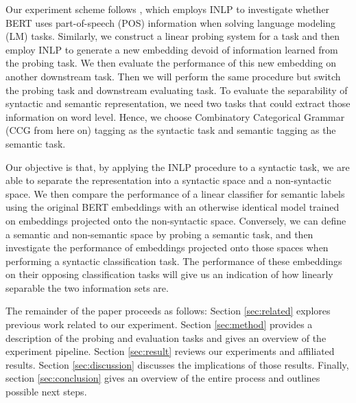 \documentclass[11pt,a4paper]{article}
\begin{document}
Our experiment scheme follows \citealp{amnesia}, which employs INLP to investigate whether BERT uses part-of-speech (POS) information when solving language modeling (LM) tasks. Similarly, we construct a linear probing system for a task and then employ INLP to generate a new embedding devoid of information learned from the probing task. We then evaluate the performance of this new embedding on another downstream task. Then we will perform the same procedure but switch the probing task and downstream evaluating task. To evaluate the separability of syntactic and semantic representation, we need two tasks that could extract those information on word level. Hence, we choose Combinatory Categorical Grammar (CCG from here on) tagging \citep{ccg-bank} as the syntactic task and semantic tagging \citep{semantics_tagging} as the semantic task. 

Our objective is that, by applying the INLP procedure to a syntactic task, we are able to separate the representation into a syntactic space and a non-syntactic space. We then compare the performance of a linear classifier for semantic labels using the original BERT embeddings with an otherwise identical model trained on embeddings projected onto the non-syntactic space. Conversely, we can define a semantic and non-semantic space by probing a semantic task, and then investigate the performance of embeddings projected onto those spaces when performing a syntactic classification task. The performance of these embeddings on their opposing classification tasks will give us an indication of how linearly separable the two information sets are.%



The remainder of the paper proceeds as follows: Section \ref{sec:related} explores previous work related to our experiment. Section \ref{sec:method} provides a description of the probing and evaluation tasks and gives an overview of the experiment pipeline. Section \ref{sec:result} reviews our experiments and affiliated results. Section \ref{sec:discussion} discusses the implications of those results. Finally, section \ref{sec:conclusion} gives an overview of the entire process and outlines possible next steps. 
\end{document}
